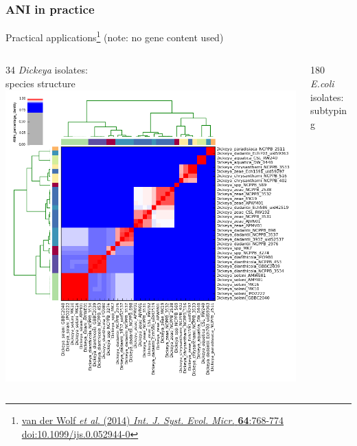 \begin{frame}
  \frametitle{ANI in practice}
  Practical applications\footnote{\tiny{\href{http://dx.doi.org/10.1099/ijs.0.052944-0}{van der Wolf \textit{et al}. (2014) \textit{Int. J. Syst. Evol. Micr.} \textbf{64}:768-774 doi:10.1099/ijs.0.052944-0}}} (note: no gene content used)\\[0.25cm]
  \begin{columns}[T]
    \begin{column}{5cm}
    34 \textit{Dickeya} isolates:\\
    species structure\\
      \includegraphics[width=1\textwidth]{images/Figure_2_figure_anim_pid_dickeya}
    \end{column}
    \begin{column}{5cm}
    180 \textit{E.coli} isolates:\\
    subtyping

\end{column}
\end{columns}
\end{frame}

